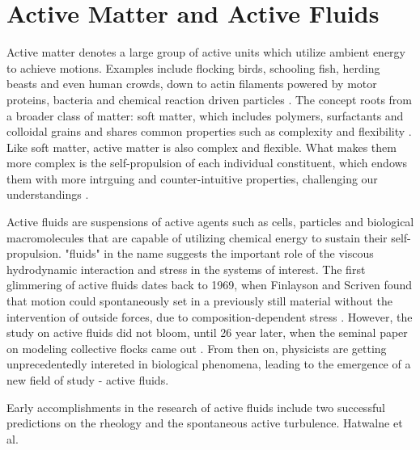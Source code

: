 \section{Active Matter and Active Fluids}
\label{active-fluids}

Active matter denotes a large group of active units which utilize ambient energy to achieve motions. Examples include flocking birds, schooling fish, herding beasts and even human crowds, down to actin filaments powered by motor proteins, bacteria and chemical reaction driven particles
\cite{Toner2005, Ramaswamy2010, Vicsek2012, Marchetti2013, Saintillan2013, Bechinger2016, Julicher2007}. The concept roots from a broader class of matter: soft matter, which includes polymers, surfactants and colloidal grains and shares common properties such as complexity and flexibility
\cite{DeGennes1992}. Like soft matter, active matter is also complex and flexible. What makes them more complex is the self-propulsion of each individual constituent, which endows them with more intrguing and counter-intuitive properties, challenging our understandings \cite{Glotzer2015}.


Active fluids are suspensions of active agents such as cells, particles and biological macromolecules that are capable of utilizing chemical energy to sustain their self-propulsion. "fluids" in the name suggests the important role of the viscous hydrodynamic interaction and stress in the systems of interest. The first glimmering of active fluids dates back to 1969, when Finlayson and Scriven found that motion could spontaneously set in a previously still material without the intervention of outside forces, due to composition-dependent stress \cite{Finlayson1969}. However, the study on active fluids did not bloom, until 26 year later, when the seminal paper on modeling collective flocks came out \cite{Vicsek1995}. From then on, physicists are getting unprecedentedly intereted in biological phenomena, leading to the emergence of a new field of study - active fluids.

Early accomplishments in the research of active fluids include two successful predictions on the rheology and the spontaneous active turbulence. Hatwalne et al. 




